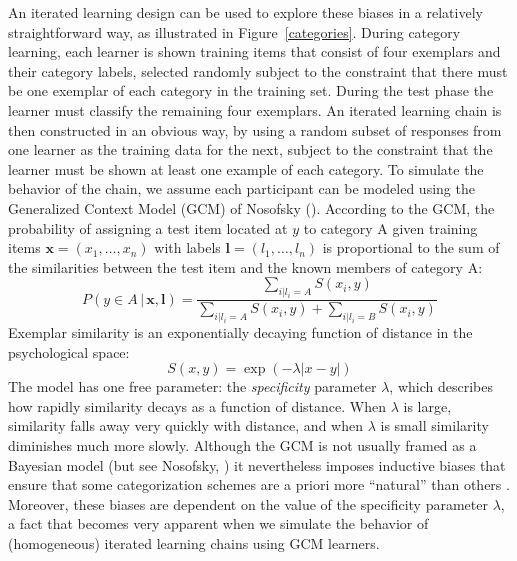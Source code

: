 \documentclass[doc]{apa6}
\newcommand{\given}{\, | \,}
\begin{document}
An iterated learning design can be used to explore these biases in a relatively straightforward way, as illustrated in Figure~\ref{categories}. During category learning, each learner is shown training items that consist of four exemplars and their category labels, selected randomly subject to the constraint that there must be one exemplar of each category in the training set. During the test phase the learner must classify the remaining four exemplars. An iterated learning chain is then constructed in an obvious way, by using a random subset of responses from one learner as the training data for the next, subject to the constraint that the learner must be shown at least one example of each category. To simulate the behavior of the chain, we assume each participant can be modeled using the Generalized Context Model (GCM) of Nosofsky (\citeyear{nosofsky_attention_1986}). According to the GCM, the probability of assigning a test item located at $y$ to category A given training items $\bm{x} = (x_1,\ldots,x_n)$ with labels $\bm{l} = (l_1, \ldots, l_n)$ is proportional to the sum of the similarities between the test item and the known members of category A:
$$
P(y \in A \given \bm{x}, \bm{l}) = \frac{\sum_{i | l_i = A} S(x_i,y)}{\sum_{i | l_i = A} S(x_i,y) + \sum_{i | l_i = B} S(x_i,y)}
$$
Exemplar similarity is an exponentially decaying function of distance in the psychological space:
$$
S(x,y) = \exp( -\lambda |x-y|)
$$
The model has one free parameter: the {\it specificity} parameter $\lambda$, which describes how rapidly similarity decays as a function of distance. When $\lambda$ is large, similarity falls away very quickly with distance, and when $\lambda$ is small similarity diminishes much more slowly. Although the GCM is not usually framed as a Bayesian model (but see Nosofsky, \citeyear{nosofsky_relation_1991}) it nevertheless imposes inductive biases that ensure that some categorization schemes are a priori more ``natural'' than others \parencite{pothos_predicting_2009}. Moreover, these biases are dependent on the value of the specificity parameter $\lambda$, a fact that becomes very apparent when we simulate the behavior of (homogeneous) iterated learning chains using GCM learners.
\end{document}
